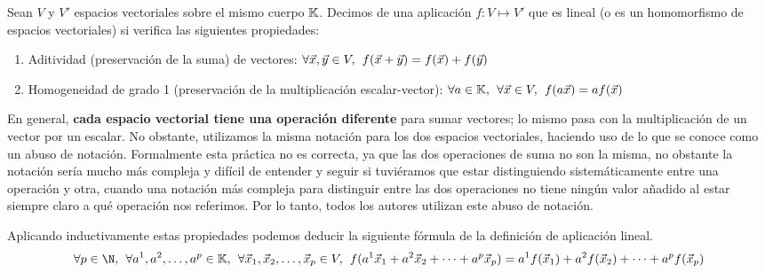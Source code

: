 \documentclass[../algebra_lineal.tex]{subfiles}
\begin{document}
\begin{definition}
Sean $V$ y $V'$ espacios vectoriales sobre el mismo cuerpo $\mathbb{K}$. Decimos de una aplicación $f:V \mapsto V'$ que es lineal (o es un homomorfismo de espacios vectoriales) si verifica las siguientes propiedades:
\begin{enumerate}
\item Aditividad (preservación de la suma) de vectores: $\forall \vec{x}, \vec{y} \in V, \hspace{1.5mm} f(\vec{x} + \vec{y}) = f(\vec{x}) + f(\vec{y})$

\item Homogeneidad de grado 1 (preservación de la multiplicación escalar-vector): $\forall a \in \mathbb{K}, \hspace{1.5mm} \forall \vec{x} \in V, \hspace{1.5mm} f(a\vec{x}) = af(\vec{x})$
\end{enumerate}
\end{definition}
\begin{remark}
En general, {\bfseries cada espacio vectorial tiene una operación diferente} para sumar vectores; lo mismo pasa con la multiplicación de un vector por un escalar. No obstante, utilizamos la misma notación para los dos espacios vectoriales, haciendo uso de lo que se conoce como un abuso de notación. Formalmente esta práctica no es correcta, ya que las dos operaciones de suma no son la misma, no obstante la notación sería mucho más compleja y difícil de entender y seguir si tuviéramos que estar distinguiendo sistemáticamente entre una operación y otra, cuando una notación más compleja para distinguir entre las dos operaciones no tiene ningún valor añadido al estar siempre claro a qué operación nos referimos. Por lo tanto, todos los autores utilizan este abuso de notación.
\end{remark}
\begin{remark}
Aplicando inductivamente estas propiedades podemos deducir la siguiente fórmula de la definición de aplicación lineal.
\[
\forall p \in \N, \spc \forall \ulst{a}{p} \in \K, \spc \forall \vlst{x}{p} \in V, \spc f(a^1\vec{x}_1+a^2\vec{x}_2+\dots +a^p\vec{x}_p)=a^1f(\vec{x}_1)+a^2f(\vec{x}_2)+\dots +a^pf(\vec{x}_p)
\]
\end{remark}
\end{document}
